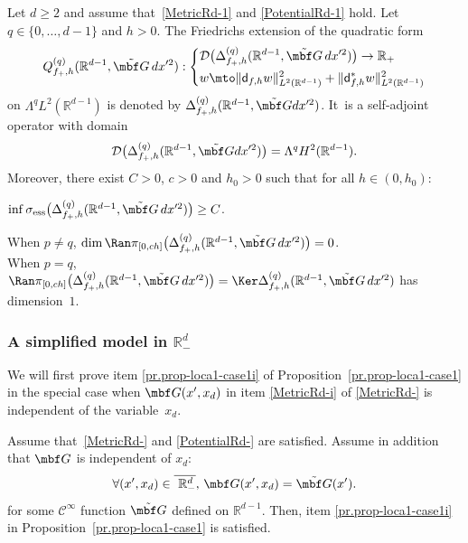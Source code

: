 \begin{proposition}\label{pr.case-d-1}
Let $d\ge 2$ and assume that~\ref{MetricRd-1} and
\ref{PotentialRd-1} hold. Let $q\in \{0,\ldots,d-1\}$ and $h
> 0$. The Friedrichs extension of the quadratic form
\[
Q_{f_+,h}^{(q)}(\mathbb R^{d-1},\tilde {\mbf G}\, dx'^2):
\left\{
\begin{aligned}
&\mathcal D\bigl(\Delta_{f_+,h}^{(q)}(\mathbb R^{d-1}, \tilde {\mbf
G}\, dx'^2) \bigr) \to \mathbb R_+\\
&w
\mto \Vert \mathsf d_{f,h}w \Vert_{L^2(\mathbb R^{d-1})}^2 + \Vert \mathsf d_{f,h}^*w \Vert_{L^2(\mathbb R^{d-1})}^2
\end{aligned}
\right.
\]
on $\Lambda^q L^2(\mathbb R^{d-1})$ is
denoted by $\Delta_{f_+,h}^{(q)}(\mathbb R^{d-1}, \tilde {\mbf
G}dx'^2)$. It~is a self-adjoint operator with domain
\[
\mathcal D\bigl(\Delta_{f_+,h}^{(q)}(\mathbb R^{d-1}, \tilde {\mbf
G}dx'^2)\bigr)=\Lambda^q H^2(\mathbb R^{d-1}).
\]
Moreover, there exist $C>0$, $c>0$ and $h_0>0$ such that for all $h\in (0,h_0)$:
\begin{enumeratei}
\item\label{pr.case-d-1i}
$\inf\sigma_{\textup{ess}}\bigl(\Delta_{f_+,h}^{(q)}(\mathbb R^{d-1}, \tilde {\mbf G}\, dx'^2)\bigr)\ge C$.

\item\label{pr.case-d-1ii}
When $p\neq q$,
$\dim \Ran \pi_{[0,ch]}\bigl(\Delta_{f_+,h}^{(q)}(\mathbb R^{d-1}, \tilde {\mbf G}\, dx'^2)\bigr)=0$.\\
When $p=q$, $\Ran \pi_{[0,ch]}\bigl(\Delta_{f_+,h}^{(q)}(\mathbb R^{d-1}, \tilde {\mbf G}\, dx'^2)\bigr)=\Ker \Delta_{f_+,h}^{(q)}(\mathbb R^{d-1}, \tilde {\mbf G}\, dx'^2)$ has dimension~$1$.
\end{enumeratei}
\end{proposition}

\subsubsection{A simplified model in $\mathbb R^d_-$}\label{sec.Rdmoins-simplified}
We will first prove item \eqref{pr.prop-loca1-case1i} of Proposition~\ref{pr.prop-loca1-case1} in the special
case when $\mbf G(x',x_d)$ in item \eqref{MetricRd-i} of \ref{MetricRd-} is independent of the variable~$x_d$.

\begin{proposition}\label{pr.prop-loca1}
Assume that~\ref{MetricRd-} and \ref{PotentialRd-} are satisfied.
Assume in addition that $\mbf G$ is independent of $x_d$:
\begin{equation}\label{eq.metric-indep}
\forall (x',x_d) \in \overline{ \mathbb R^d_-},\, \mbf G(x',x_d)=\tilde {\mbf G}(x').
\end{equation}
for some $\mathcal C^\infty$ function $\tilde{\mbf G}$ defined on $\mathbb R^{d-1}$.
Then, item \eqref{pr.prop-loca1-case1i} in Proposition~\ref{pr.prop-loca1-case1} is satisfied.
\end{proposition}

